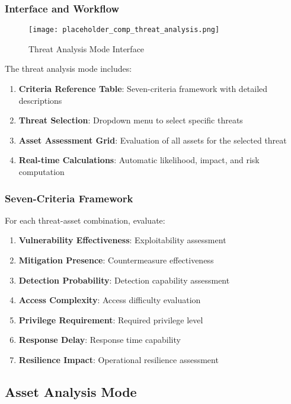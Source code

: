 \documentclass[binding=0.6cm]{sapthesis}
\begin{document}
\subsubsection{Interface and Workflow}

\begin{figure}[H]
    \centering
    \texttt{[image: placeholder\_comp\_threat\_analysis.png]}
    \caption{Threat Analysis Mode Interface}
    \label{fig:comp_threat_analysis}
\end{figure}

The threat analysis mode includes:
\begin{enumerate}
    \item \textbf{Criteria Reference Table}: Seven-criteria framework with detailed descriptions
    \item \textbf{Threat Selection}: Dropdown menu to select specific threats
    \item \textbf{Asset Assessment Grid}: Evaluation of all assets for the selected threat
    \item \textbf{Real-time Calculations}: Automatic likelihood, impact, and risk computation
\end{enumerate}

\subsubsection{Seven-Criteria Framework}
For each threat-asset combination, evaluate:
\begin{enumerate}
    \item \textbf{Vulnerability Effectiveness}: Exploitability assessment
    \item \textbf{Mitigation Presence}: Countermeasure effectiveness
    \item \textbf{Detection Probability}: Detection capability assessment
    \item \textbf{Access Complexity}: Access difficulty evaluation
    \item \textbf{Privilege Requirement}: Required privilege level
    \item \textbf{Response Delay}: Response time capability
    \item \textbf{Resilience Impact}: Operational resilience assessment
\end{enumerate}

\subsection{Asset Analysis Mode}
\end{document}

